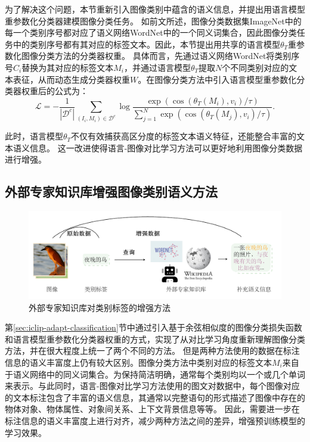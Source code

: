 为了解决这个问题，本节重新引入图像类别中蕴含的语义信息，并提出用语言模型重参数化分类器建模图像分类任务。
如前文所述，图像分类数据集ImageNet中的每一个类别序号都对应了语义网络WordNet中的一个同义词集合，因此图像分类任务中的类别序号都有其对应的标签文本。因此，本节提出用共享的语言模型$\theta_{T}$重参数化图像分类方法的分类器权重。
具体而言，先通过语义网络WordNet将类别序号$C_{i}$替换为其对应的标签文本$M_{i}$，并通过语言模型$\theta_{T}$提取$N$个不同类别对应的文本表征，从而动态生成分类器权重$W$。在图像分类方法中引入语言模型重参数化分类器权重后的公式为：
\begin{equation}
    \mathcal{L}=-\frac{1}{\left|\mathcal{D}^{c}\right|} \sum_{\left(I_{i}, M_{i}\right) \in \mathcal{D}^{c}} \log \frac{\exp \left(\cos \left(\theta_{T}\left(M_{i}\right), v_{i}\right) / \tau\right)}{\sum_{j=1}^{N} \exp \left(\cos \left(\theta_{T}\left(M_{j}\right), v_{i}\right) / \tau\right)}.
    \label{eq:iclip-wo-dictionary}
\end{equation}

此时，语言模型$\theta_{T}$不仅有效捕获高区分度的标签文本语义特征，还能整合丰富的文本语义信息。
这一改进使得语言-图像对比学习方法可以更好地利用图像分类数据进行增强。

\subsection{外部专家知识库增强图像类别语义方法} 
\label{sec:iclip-adapt-external}
\begin{figure}
  \centering
  \includegraphics[width=1.0\linewidth]{figures/iclip-knowledge.pdf}
  \caption{外部专家知识库对类别标签的增强方法}
  \label{fig:iclip-knowledge}
\end{figure}
第\ref{sec:iclip-adapt-classification}节中通过引入基于余弦相似度的图像分类损失函数和语言模型重参数化分类器权重的方式，实现了从对比学习角度重新理解图像分类方法，并在很大程度上统一了两个不同的方法。
但是两种方法使用的数据在标注信息的语义丰富度上仍有较大区别。图像分类方法中类别对应的标签文本$M_i$来自于语义网络中的同义词集合。为保持简洁明确，通常每个类别均以一个或几个单词来表示。与此同时，语言-图像对比学习方法使用的图文对数据中，每个图像对应的文本标注包含了丰富的语义信息，其通常以完整语句的形式描述了图像中存在的物体对象、物体属性、对象间关系、上下文背景信息等等。
因此，需要进一步在标注信息的语义丰富度上进行对齐，减少两种方法之间的差异，增强预训练模型的学习效果。

